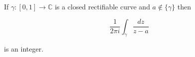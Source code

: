If $\gamma : [0, 1] \to \mathbb{C}$ is a closed rectifiable curve and $a \notin \{\gamma\}$ then

$$\frac{1}{2\pi i} \int_{\gamma} \frac{dz}{z-a}$$

is an integer.